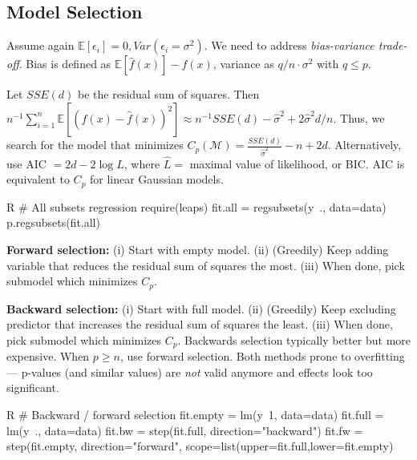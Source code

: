 \subsection{Model Selection}\label{subsec:model_selection}
\begin{sectionbox}\nospacing{}
  Assume again $\mathbb{E}[\epsilon_{i}] = 0, Var(\epsilon_{i} = \sigma^{2})$.
  We need to address \emph{bias-variance trade-off}.
  Bias is defined as $\mathbb{E} [\hat f(x)] - f(x)$, variance as $q/n \cdot \sigma^{2}$ with $q \leq p$.
\end{sectionbox}
\begin{sectionbox}\nospacing{}
  Let $SSE(d)$ be the residual sum of squares.
  Then $n^{-1} \sum_{i=1}^{n} \mathbb{E}\left[{(f(x) - \hat f(x))}^{2}\right] \approx n^{-1}SSE(d)-\hat \sigma^{2} + 2\hat\sigma^{2}d/n$.
  Thus, we search for the model that minimizes $C_{p}(\mathcal{M}) = \frac{SSE(d)}{\hat \sigma^{2}} - n + 2d$.
  Alternatively, use AIC $=2d-2\log \hat{L}$, where $\hat{L}=$ maximal value of likelihood, or BIC. AIC is equivalent to $C_{p}$ for linear Gaussian models.
  \begin{mintlinebox}{R}
    # All subsets regression
    require(leaps)
    fit.all = regsubsets(y~., data=data)
    p.regsubsets(fit.all)
  \end{mintlinebox}
\end{sectionbox}
\begin{sectionbox}\nospacing{}
  \textbf{Forward selection:} (i) Start with empty model. (ii) (Greedily) Keep adding variable that reduces the residual sum of squares the most. (iii) When done, pick submodel which minimizes $C_{p}$.

  \textbf{Backward selection:} (i) Start with full model. (ii) (Greedily) Keep excluding predictor that increases the residual sum of squares the least. (iii) When done, pick submodel which minimizes $C_{p}$.
  Backwards selection typically better but more expensive. When $p \geq n$, use forward selection.
  Both methods prone to overfitting --- p-values (and similar values) are \emph{not} valid anymore and effects look too significant.
  \begin{mintlinebox}{R}
    # Backward / forward selection
    fit.empty = lm(y~1, data=data)
    fit.full = lm(y~., data=data)
    fit.bw = step(fit.full, direction="backward")
    fit.fw = step(fit.empty, direction="forward", scope=list(upper=fit.full,lower=fit.empty)
  \end{mintlinebox}

\end{sectionbox}
